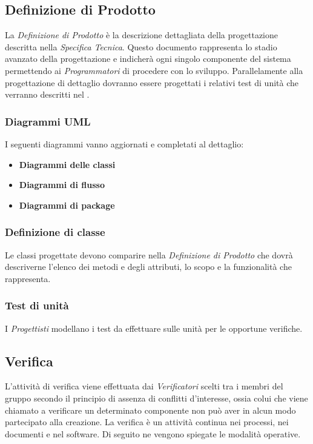 \subsection{Definizione di Prodotto}
La \emph{Definizione di Prodotto} è la descrizione dettagliata della progettazione descritta nella \emph{Specifica Tecnica}. Questo documento rappresenta lo stadio avanzato della progettazione e indicherà ogni singolo componente del sistema permettendo ai \emph{Programmatori} di procedere con lo sviluppo. Parallelamente alla progettazione di dettaglio dovranno essere progettati i relativi test di unità che verranno descritti nel \PianoDiQualifica .

	\subsubsection{Diagrammi UML}
	I seguenti diagrammi vanno aggiornati e completati al dettaglio:
	\begin{itemize}
 		\item \textbf{Diagrammi delle classi} %
 		\item \textbf{Diagrammi di flusso} %
		 \item \textbf{Diagrammi di package} %
	\end{itemize}
	
	\subsubsection{Definizione di classe}
	Le classi progettate devono comparire nella \emph{Definizione di Prodotto} che dovrà descriverne l'elenco dei metodi e degli attributi, lo scopo e la funzionalità che rappresenta.
	
	
	\subsubsection{Test di unità}
	I \emph{Progettisti} modellano i test da effettuare sulle unità per le opportune verifiche.

\subsection{Verifica}
L'attività di verifica viene effettuata dai \emph{Verificatori} scelti tra i membri del gruppo secondo il principio di assenza di conflitti d'interesse, ossia colui che viene chiamato a verificare un determinato componente non può aver in alcun modo partecipato alla creazione. La verifica è un attività continua nei processi, nei documenti e nel software. Di seguito ne vengono spiegate le modalità operative.

